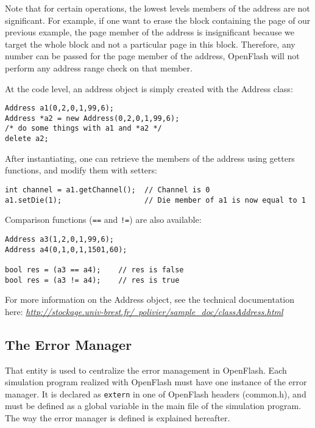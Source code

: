 Note that for certain operations, the lowest levels members of the address are not significant. For example, if one want to erase the block containing the page of our previous example, the page member of the address is insignificant because we target the whole block and not a particular page in this block. Therefore, any number can be passed for the page member of the address, OpenFlash will not perform any address range check on that member.

At the code level, an address object is simply created with the Address class:

\begin{lstlisting}
Address a1(0,2,0,1,99,6);
Address *a2 = new Address(0,2,0,1,99,6);
/* do some things with a1 and *a2 */
delete a2;
\end{lstlisting}

After instantiating, one can retrieve the members of the address using getters functions, and modify them with setters:

\begin{lstlisting}
int channel = a1.getChannel();  // Channel is 0
a1.setDie(1);                   // Die member of a1 is now equal to 1
\end{lstlisting}

Comparison functions (\verb+==+ and \verb+!=+) are also available:

\begin{lstlisting}
Address a3(1,2,0,1,99,6);
Address a4(0,1,0,1,1501,60);

bool res = (a3 == a4);    // res is false
bool res = (a3 != a4);    // res is true
\end{lstlisting}

For more information on the Address object, see the technical documentation here: \href{http://stockage.univ-brest.fr/~polivier/sample_doc/classAddress.html}{\textit{http://stockage.univ-brest.fr/~polivier/sample\_doc/classAddress.html}}

\subsection{The Error Manager}
That entity is used to centralize the error management in OpenFlash. Each simulation program realized with OpenFlash must have one instance of the error manager. It is declared as \verb+extern+ in one of OpenFlash headers (common.h), and must be defined as a global variable in the main file of the simulation program. The way the error manager is defined is explained hereafter.

